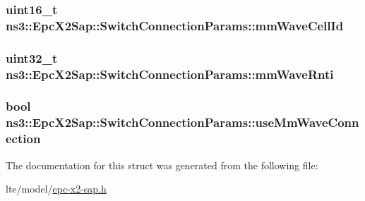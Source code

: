 \subsubsection[{\texorpdfstring{mm\+Wave\+Cell\+Id}{mmWaveCellId}}]{\setlength{\rightskip}{0pt plus 5cm}uint16\+\_\+t ns3\+::\+Epc\+X2\+Sap\+::\+Switch\+Connection\+Params\+::mm\+Wave\+Cell\+Id}\hypertarget{structns3_1_1EpcX2Sap_1_1SwitchConnectionParams_a45d3a6cc4d1512fe8aa0a494fdbf8927}{}\label{structns3_1_1EpcX2Sap_1_1SwitchConnectionParams_a45d3a6cc4d1512fe8aa0a494fdbf8927}
\subsubsection[{\texorpdfstring{mm\+Wave\+Rnti}{mmWaveRnti}}]{\setlength{\rightskip}{0pt plus 5cm}uint32\+\_\+t ns3\+::\+Epc\+X2\+Sap\+::\+Switch\+Connection\+Params\+::mm\+Wave\+Rnti}\hypertarget{structns3_1_1EpcX2Sap_1_1SwitchConnectionParams_a431a9f7abb000bef3bb4ff02b80e486f}{}\label{structns3_1_1EpcX2Sap_1_1SwitchConnectionParams_a431a9f7abb000bef3bb4ff02b80e486f}
\subsubsection[{\texorpdfstring{use\+Mm\+Wave\+Connection}{useMmWaveConnection}}]{\setlength{\rightskip}{0pt plus 5cm}bool ns3\+::\+Epc\+X2\+Sap\+::\+Switch\+Connection\+Params\+::use\+Mm\+Wave\+Connection}\hypertarget{structns3_1_1EpcX2Sap_1_1SwitchConnectionParams_a6c23932e8305d6f7e691043675e0b19b}{}\label{structns3_1_1EpcX2Sap_1_1SwitchConnectionParams_a6c23932e8305d6f7e691043675e0b19b}


The documentation for this struct was generated from the following file\+:\begin{DoxyCompactItemize}
\item 
lte/model/\hyperlink{epc-x2-sap_8h}{epc-\/x2-\/sap.\+h}\end{DoxyCompactItemize}
